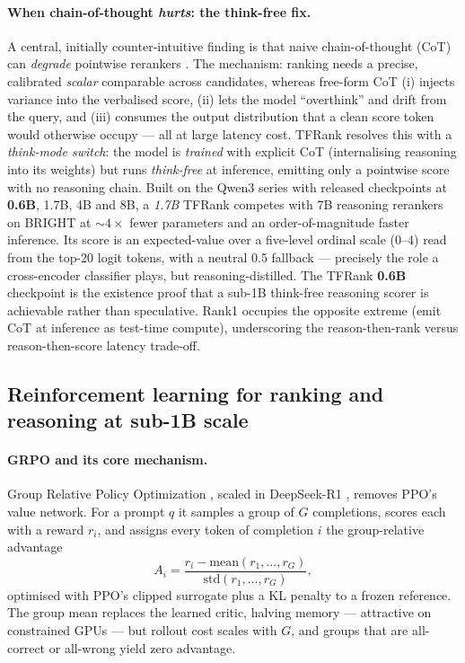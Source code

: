 \paragraph{When chain-of-thought \emph{hurts}: the think-free fix.} A central,
initially counter-intuitive finding is that naive chain-of-thought (CoT) can
\emph{degrade} pointwise rerankers \citep{rl:cotfallsshort2025}. The mechanism:
ranking needs a precise, calibrated \emph{scalar} comparable across candidates,
whereas free-form CoT (i) injects variance into the verbalised score, (ii) lets
the model ``overthink'' and drift from the query, and (iii) consumes the output
distribution that a clean score token would otherwise occupy --- all at large
latency cost. TFRank \citep{rl:tfrank2025} resolves this with a
\emph{think-mode switch}: the model is \emph{trained} with explicit CoT
(internalising reasoning into its weights) but runs \emph{think-free} at
inference, emitting only a pointwise score with no reasoning chain. Built on the
Qwen3 series with released checkpoints at \textbf{0.6B}, 1.7B, 4B and 8B, a
\emph{1.7B} TFRank competes with 7B reasoning rerankers on BRIGHT at ${\sim}4\times$
fewer parameters and an order-of-magnitude faster inference. Its score is an
expected-value over a five-level ordinal scale (0--4) read from the top-20 logit
tokens, with a neutral 0.5 fallback --- precisely the role a cross-encoder
classifier plays, but reasoning-distilled. The TFRank \textbf{0.6B} checkpoint is
the existence proof that a sub-1B think-free reasoning scorer is achievable rather
than speculative. Rank1 \citep{rl:weller2025rank1} occupies the opposite extreme
(emit CoT at inference as test-time compute), underscoring the
reason-then-rank{} versus reason-then-score{} latency trade-off.

\subsection{Reinforcement learning for ranking and reasoning at sub-1B scale}
\label{sec:rl-sub1b}
\paragraph{GRPO and its core mechanism.} Group Relative Policy Optimization
\citep{rl:shao2024grpo}, scaled in DeepSeek-R1 \citep{rl:deepseekr1}, removes
PPO's value network. For a prompt $q$ it samples a group of $G$ completions,
scores each with a reward $r_i$, and assigns every token of completion $i$ the
group-relative advantage
\begin{equation}
A_i = \frac{r_i - \mathrm{mean}(r_1,\ldots,r_G)}{\mathrm{std}(r_1,\ldots,r_G)},
\label{eq:grpo-adv}
\end{equation}
optimised with PPO's clipped surrogate plus a KL penalty to a frozen reference.
The group mean replaces the learned critic, halving memory --- attractive on
constrained GPUs --- but rollout cost scales with $G$, and groups that are
all-correct or all-wrong yield zero advantage.


